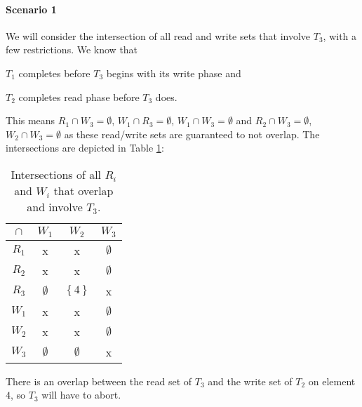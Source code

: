\documentclass[11pt,a4paper,english]{article}
\begin{document}
\paragraph{Scenario 1}
We will consider the intersection of all read and write sets that involve
$T_{3}$, with a few restrictions. We know that \begin{inparaenum}[1)] \item
$T_{1}$ completes before
$T_{3}$ begins with its write phase and \item $T_{2}$ completes read phase before
$T_{3}$ does.\end{inparaenum} This means $R_{1} \cap W_{3} = \emptyset$,
$W_{1} \cap R_{3} = \emptyset$, $W_{1} \cap W_{3} = \emptyset$ and
$R_{2} \cap W_{3} = \emptyset$, $W_{2} \cap W_{3} = \emptyset$ as these
read/write sets are guaranteed to not overlap. The intersections are depicted in
Table \ref{tbl:scenario1}:
\begin{table}[!hbt]
\centering
\begin{tabular}{|c|c|c|c|}
\hline
$\cap$  & $W_{1}$ & $W_{2}$ & $W_{3}$    \\ \hline
$R_{1}$ & x  & x  & $\emptyset$ \\ \hline
$R_{2}$ & x  & x  & $\emptyset$ \\ \hline
$R_{3}$ & $\emptyset$ & $\left\{ 4 \right\}$ & x \\ \hline
$W_{1}$ & x  & x  & $\emptyset$ \\ \hline
$W_{2}$ & x  & x  & $\emptyset$ \\ \hline
$W_{3}$ & $\emptyset$ & $\emptyset$ & x \\ \hline
\end{tabular}
\caption{Intersections of all $R_{i}$ and $W_{i}$ that overlap and involve $T_{3}$.}
\label{tbl:scenario1}
\end{table}

There is an overlap between the read set of $T_{3}$ and the write set of $T_{2}$ on element $4$, so $T_{3}$ will have to abort.
\end{document}
